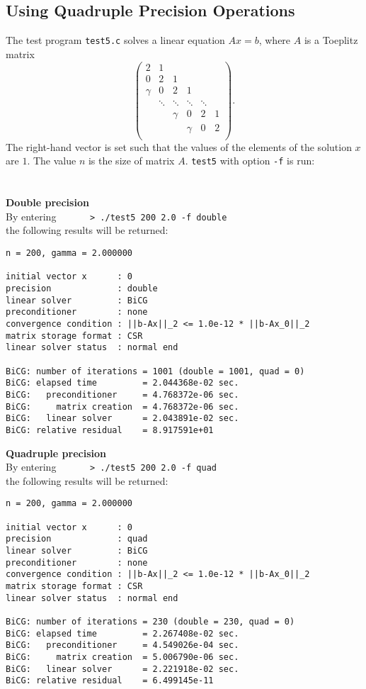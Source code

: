 \documentclass[a4paper]{article}
\begin{document}
\subsection{Using Quadruple Precision Operations}
\label{sec:testprog5}
The test program \verb|test5.c| solves a linear equation $Ax =b$, where $A$ is a Toeplitz matrix
\[
\left(
\begin{array}{cccccc}
2 & 1 &   &  &  & \\
0 & 2 & 1 &  &  & \\
\gamma & 0& 2 & 1 &  & \\
 & \ddots & \ddots & \ddots & \ddots & \\
 &  &   \gamma &0 &       2   & 1 \\
 &  &  &   \gamma & 0& 2 \\
\end{array}
\right).
\]
The right-hand vector is set such that the values of the elements 
of the solution $x$ are $1$. The value $n$ is the size of matrix $A$.
\verb|test5| with option {\tt -f} is run: \\
\\ \\
\noindent
{\bf Double precision}\\
By entering
\verb+      > ./test5 200 2.0 -f double+\\
the following results will be returned:

\begin{verbatim}
n = 200, gamma = 2.000000

initial vector x      : 0
precision             : double
linear solver         : BiCG
preconditioner        : none
convergence condition : ||b-Ax||_2 <= 1.0e-12 * ||b-Ax_0||_2
matrix storage format : CSR
linear solver status  : normal end

BiCG: number of iterations = 1001 (double = 1001, quad = 0)
BiCG: elapsed time         = 2.044368e-02 sec.
BiCG:   preconditioner     = 4.768372e-06 sec. 
BiCG:     matrix creation  = 4.768372e-06 sec.
BiCG:   linear solver      = 2.043891e-02 sec.
BiCG: relative residual    = 8.917591e+01
\end{verbatim}

\noindent
{\bf Quadruple precision}\\
By entering
\verb+      > ./test5 200 2.0 -f quad+\\
the following results will be returned:

\begin{verbatim}
n = 200, gamma = 2.000000

initial vector x      : 0
precision             : quad
linear solver         : BiCG
preconditioner        : none
convergence condition : ||b-Ax||_2 <= 1.0e-12 * ||b-Ax_0||_2
matrix storage format : CSR
linear solver status  : normal end

BiCG: number of iterations = 230 (double = 230, quad = 0)
BiCG: elapsed time         = 2.267408e-02 sec.
BiCG:   preconditioner     = 4.549026e-04 sec. 
BiCG:     matrix creation  = 5.006790e-06 sec.
BiCG:   linear solver      = 2.221918e-02 sec.
BiCG: relative residual    = 6.499145e-11
\end{verbatim}
\end{document}
